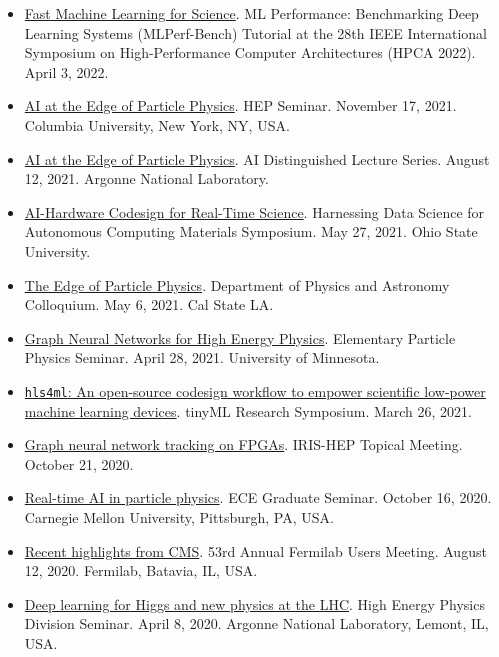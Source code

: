 \documentclass[11pt]{res}
\begin{document}
\begin{resume}
\begin{itemize}
    \item \href{https://sites.google.com/g.harvard.edu/mlperf-bench-hpca22/home}{Fast Machine Learning for Science}. ML Performance: Benchmarking Deep Learning Systems (MLPerf-Bench) Tutorial at the 28th IEEE International Symposium on High-Performance Computer Architectures (HPCA 2022). April 3, 2022.
    \item \href{https://physics.columbia.edu/events/hep-seminar-dr-javier-duarte-ucsd}{AI at the Edge of Particle Physics}. HEP Seminar. November 17, 2021. Columbia University, New York, NY, USA.
    \item \href{https://www.anl.gov/event/ai-at-the-edge-of-particle-physics}{AI at the Edge of Particle Physics}. AI Distinguished Lecture Series. August 12, 2021. Argonne National Laboratory.
    \item \href{https://tdai.osu.edu/events/acm-symposium-harnessing-data-science-autonomous-computing-materials}{AI-Hardware Codesign for Real-Time Science}. Harnessing Data Science for Autonomous Computing Materials Symposium. May 27, 2021. Ohio State University.
    \item \href{https://www.calstatela.edu/dept/physics/colloquia-and-events}{The Edge of Particle Physics}. Department of Physics and Astronomy Colloquium. May 6, 2021. Cal State LA.
    \item \href{https://cse.umn.edu/physics/elementary-particle-physics-elem-part-phys-seminar}{Graph Neural Networks for High Energy Physics}. Elementary Particle Physics Seminar. April 28, 2021. University of Minnesota.
    \item \href{https://www.tinyml.org/event/research-symposium-2021/}{\texttt{hls4ml}: An open-source codesign workflow to empower scientific low-power machine learning devices}. tinyML Research Symposium. March 26, 2021.
    \item \href{https://indico.cern.ch/event/955026/}{Graph neural network tracking on FPGAs}. IRIS-HEP Topical Meeting. October 21, 2020.
    \item \href{https://www.cs.cmu.edu/calendar/fri-2020-10-16-1200/ece-graduate-seminar}{Real-time AI in particle physics}. ECE Graduate Seminar. October 16, 2020. Carnegie Mellon University, Pittsburgh, PA, USA.
    \item \href{https://indico.fnal.gov/event/23109/contributions/193292/}{Recent highlights from CMS}. 53rd Annual Fermilab Users Meeting. August 12, 2020. Fermilab, Batavia, IL, USA.
    \item \href{https://indico.fnal.gov/event/22961/}{Deep learning for Higgs and new physics at the LHC}. High Energy Physics Division Seminar. April 8, 2020. Argonne National Laboratory, Lemont, IL, USA.

\end{itemize}
\end{resume}
\end{document}
